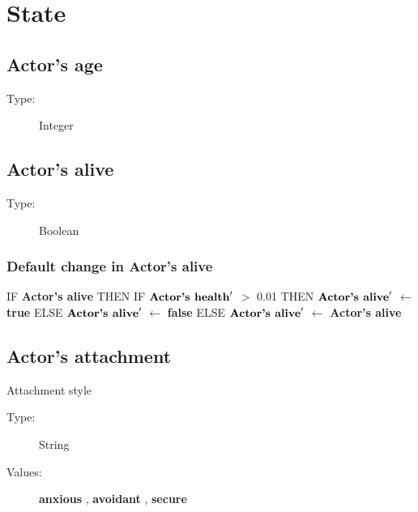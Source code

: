 \documentclass{article}%
\begin{document}
%
\section{State}%
\label{sec:State}%
\subsection{Actor's age}%
\label{subsec:Actor's age}%
\begin{description}%
\item[Type:]%
Integer%
\end{description}

%
\subsection{Actor's alive}%
\label{subsec:Actor's alive}%
\begin{description}%
\item[Type:]%
Boolean%
\end{description}%
\subsubsection{Default change in Actor's alive}%
\label{ssubsec:Default change in Actor's alive}%
\begin{flushleft}%
IF %
\textbf{Actor's alive}%
\linebreak%
\hspace*{2em}%
THEN %
IF %
$\mbox{\textbf{Actor's health}} '$%
$>$%
0.01%
\linebreak%
\hspace*{4em}%
THEN %
$\mbox{\textbf{Actor's alive}} '$%
$\leftarrow$%
\textbf{true}%
\linebreak%
\hspace*{4em}%
ELSE %
$\mbox{\textbf{Actor's alive}} '$%
$\leftarrow$%
\textbf{false}%
\linebreak%
\hspace*{2em}%
ELSE %
$\mbox{\textbf{Actor's alive}} '$%
$\leftarrow$%
\textbf{Actor's alive}%
\end{flushleft}

%
\subsection{Actor's attachment}%
\label{subsec:Actor's attachment}%
Attachment style%
\begin{description}%
\item[Type:]%
String%
\item[Values:]%
\textbf{anxious}%
, %
\textbf{avoidant}%
, %
\textbf{secure}%
\end{description}
\end{document}
